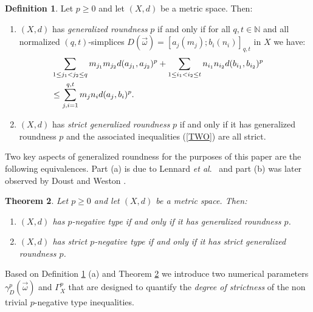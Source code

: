 \documentclass[10pt]{amsart}
\newtheorem{thm}{Theorem}[section]
\theoremstyle{definition}
\newtheorem{defn}[thm]{Definition}
\theoremstyle{remark}
\begin{document}
\begin{defn}\label{GRUNT}
Let $p \geq 0$ and let $(X,d)$ be a metric space. Then:
\begin{enumerate}
\item[(a)] $(X,d)$ has \textit{generalized roundness} $p$ if and only if
for all $q,t \in \mathbb{N}$ and all normalized $(q,t)$-simplices $D(\vec{\omega})
= [a_{j}(m_{j});b_{i}(n_{i})]_{q,t}$
in $X$ we have:
\begin{eqnarray}\label{TWO}
\sum\limits_{1 \leq j_{1} < j_{2} \leq q} m_{j_{1}}m_{j_{2}}d(a_{j_{1}},a_{j_{2}})^{p} +
\sum\limits_{1 \leq i_{1} < i_{2} \leq t} n_{i_{1}}n_{i_{2}}d(b_{i_{1}},b_{i_{2}})^{p} & ~ & \\
\leq \sum\limits_{j,i=1}^{q,t} m_{j}n_{i}d(a_{j},b_{i})^{p}. \hspace*{2.11in} & ~ & ~ \nonumber
\end{eqnarray}

\item[(b)] $(X,d)$ has \textit{strict generalized roundness} $p$ if and only if it has generalized
roundness $p$ and the associated inequalities (\ref{TWO}) are all strict.
\end{enumerate}
\end{defn}
\noindent Two key aspects of generalized roundness for the purposes of this paper are the following equivalences.
Part (a) is due to Lennard \textit{et al}.\ \cite{LTW} and part (b) was later observed by Doust and Weston \cite{DW}.

\begin{thm}\label{REMGR} Let $p \geq 0$ and let $(X,d)$ be a metric space. Then:
\begin{enumerate}
\item[(a)] $(X,d)$ has $p$-negative type if and only if
it has generalized roundness $p$.

\item[(b)] $(X,d)$ has strict $p$-negative type if and only if
it has strict generalized roundness $p$.
\end{enumerate}
\end{thm}

Based on Definition \ref{GRUNT} (a) and Theorem \ref{REMGR} we introduce two numerical
parameters $\gamma_{D}^{p}(\vec{\omega})$
and $\Gamma_{X}^{p}$ that are designed to quantify the \textit{degree of strictness}
of the non trivial $p$-negative type inequalities.
\end{document}
